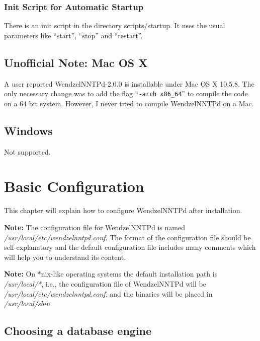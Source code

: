 \documentclass[12pt,fleqn,leqno]{scrbook}
\begin{document}
\hypertarget{init-script-for-automatic-startup}{%
\subsubsection{Init Script for Automatic
Startup}\label{init-script-for-automatic-startup}}

There is an init script in the directory scripts/startup. It uses the
usual parameters like ``start'', ``stop'' and ``restart''.

\hypertarget{unofficial-note-mac-os-x}{%
\subsection{Unofficial Note: Mac OS X}\label{unofficial-note-mac-os-x}}

A user reported WendzelNNTPd-2.0.0 is installable under Mac OS X 10.5.8.
The only necessary change was to add the flag
``\texttt{-arch\ x86\_64}'' to compile the code on a 64 bit system.
However, I never tried to compile WendzelNNTPd on a Mac.

\hypertarget{windows}{%
\subsection{Windows}\label{windows}}

Not supported.

\hypertarget{basic-configuration-1}{%
\section{Basic Configuration}\label{basic-configuration-1}}

\protect\hypertarget{Ch:Config}{}{}

This chapter will explain how to configure WendzelNNTPd after
installation.

\textbf{Note:} The configuration file for WendzelNNTPd is named
\emph{/usr/local/etc/wendzelnntpd.conf}. The format of the configuration
file should be self-explanatory and the default configuration file
includes many comments which will help you to understand its content.

\textbf{Note:} On *nix-like operating systems the default installation
path is \emph{/usr/local/*}, i.e., the configuration file of
WendzelNNTPd will be \emph{/usr/local/etc/wendzelnntpd.conf}, and the
binaries will be placed in \emph{/usr/local/sbin}.

\hypertarget{choosing-a-database-engine-1}{%
\subsection{Choosing a database
engine}\label{choosing-a-database-engine-1}}
\end{document}
